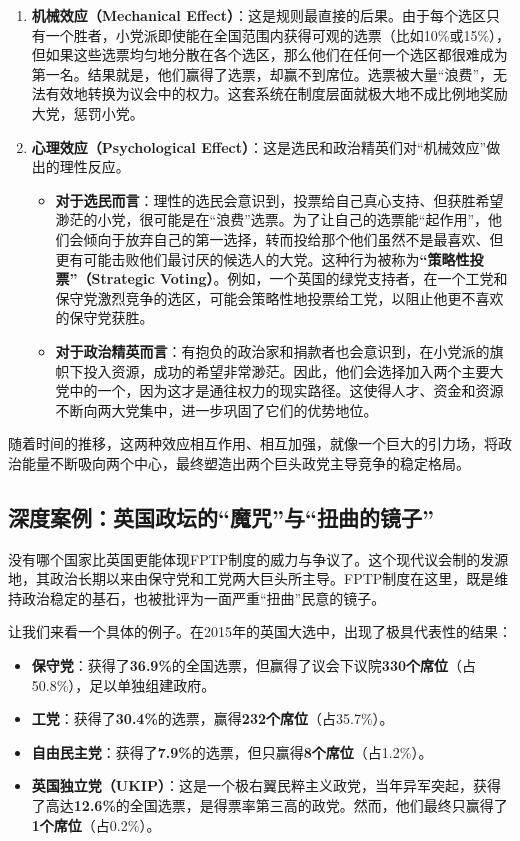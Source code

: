 \begin{enumerate}
    \item \textbf{机械效应（Mechanical Effect）}：这是规则最直接的后果。由于每个选区只有一个胜者，小党派即使能在全国范围内获得可观的选票（比如10\%或15\%），但如果这些选票均匀地分散在各个选区，那么他们在任何一个选区都很难成为第一名。结果就是，他们赢得了选票，却赢不到席位。选票被大量“浪费”，无法有效地转换为议会中的权力。这套系统在制度层面就极大地不成比例地奖励大党，惩罚小党。
    \item \textbf{心理效应（Psychological Effect）}：这是选民和政治精英们对“机械效应”做出的理性反应。
    \begin{itemize}
        \item \textbf{对于选民而言}：理性的选民会意识到，投票给自己真心支持、但获胜希望渺茫的小党，很可能是在“浪费”选票。为了让自己的选票能“起作用”，他们会倾向于放弃自己的第一选择，转而投给那个他们虽然不是最喜欢、但更有可能击败他们最讨厌的候选人的大党。这种行为被称为\textbf{“策略性投票”（Strategic Voting）}。例如，一个英国的绿党支持者，在一个工党和保守党激烈竞争的选区，可能会策略性地投票给工党，以阻止他更不喜欢的保守党获胜。
        \item \textbf{对于政治精英而言}：有抱负的政治家和捐款者也会意识到，在小党派的旗帜下投入资源，成功的希望非常渺茫。因此，他们会选择加入两个主要大党中的一个，因为这才是通往权力的现实路径。这使得人才、资金和资源不断向两大党集中，进一步巩固了它们的优势地位。
    \end{itemize}
\end{enumerate}

随着时间的推移，这两种效应相互作用、相互加强，就像一个巨大的引力场，将政治能量不断吸向两个中心，最终塑造出两个巨头政党主导竞争的稳定格局。

\subsection{深度案例：英国政坛的“魔咒”与“扭曲的镜子”}

没有哪个国家比英国更能体现FPTP制度的威力与争议了。这个现代议会制的发源地，其政治长期以来由保守党和工党两大巨头所主导。FPTP制度在这里，既是维持政治稳定的基石，也被批评为一面严重“扭曲”民意的镜子。

让我们来看一个具体的例子。在2015年的英国大选中，出现了极具代表性的结果：

\begin{itemize}
    \item \textbf{保守党}：获得了\textbf{36.9\%}的全国选票，但赢得了议会下议院\textbf{330个席位}（占50.8\%），足以单独组建政府。
    \item \textbf{工党}：获得了\textbf{30.4\%}的选票，赢得\textbf{232个席位}（占35.7\%）。
    \item \textbf{自由民主党}：获得了\textbf{7.9\%}的选票，但只赢得\textbf{8个席位}（占1.2\%）。
    \item \textbf{英国独立党（UKIP）}：这是一个极右翼民粹主义政党，当年异军突起，获得了高达\textbf{12.6\%}的全国选票，是得票率第三高的政党。然而，他们最终只赢得了\textbf{1个席位}（占0.2\%）。
\end{itemize}

